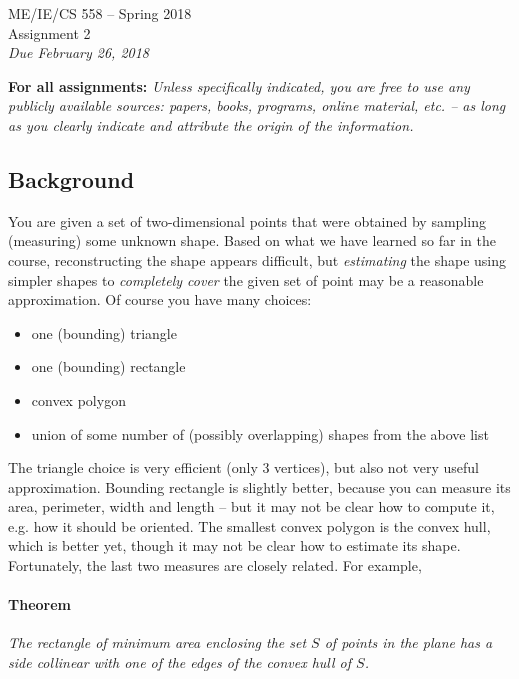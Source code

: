 \documentclass[]{article}
\begin{document}
\begin{center}
{\Large ME/IE/CS 558 -- Spring 2018}\\ \vspace{12pt} {\large
Assignment 2}\\ \vspace{12pt} {\em Due February 26, 2018}
\end{center}

\vspace{12pt}

{\bf For all assignments:}
{\em Unless specifically indicated,  you are free to use any
publicly available sources: papers, books, programs, online
material, etc. -- as long as you clearly indicate and attribute
the origin of the information.}

\subsection* {Background}

You are given a set of two-dimensional points that were obtained
by sampling (measuring) some unknown shape.  Based on what we have
learned so far in the course, reconstructing the shape appears
difficult, but {\em estimating\/} the shape using simpler shapes
to {\em completely cover\/} the given set of point may be a
reasonable approximation. Of course you have many choices:
\begin{itemize}
\item
one (bounding) triangle
\item
one (bounding) rectangle
\item
convex polygon
\item
union of some number of  (possibly overlapping) shapes from the above list
\end{itemize}
The triangle choice is very efficient (only 3 vertices), but also not very
useful approximation.  Bounding rectangle is slightly better, because you can
measure its area, perimeter, width and length -- but it may not be clear how to
compute it, e.g. how it should be oriented.  The smallest convex polygon is the  convex hull, which is better yet,
though it may not be clear how to estimate its shape.
Fortunately, the last two measures are closely related.  For example,
\paragraph{Theorem}
{\em The rectangle of minimum area enclosing the set $S$ of points
in the plane has a side collinear with one of the edges of the
convex hull of $S$.\/}
\end{document}
